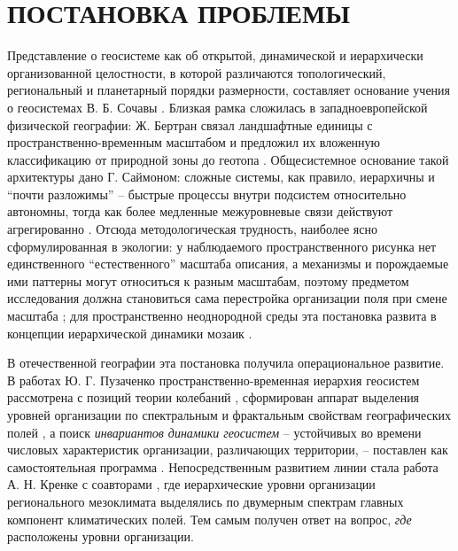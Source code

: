 \documentclass[12pt,a4paper]{article}
\begin{document}
\section{ПОСТАНОВКА ПРОБЛЕМЫ}

Представление о геосистеме как об открытой, динамической и иерархически организованной целостности, в которой различаются топологический, региональный и планетарный порядки размерности, составляет основание учения о геосистемах В. Б. Сочавы \cite{Sochava1978}. Близкая рамка сложилась в западноевропейской физической географии: Ж. Бертран связал ландшафтные единицы с пространственно-временным масштабом и предложил их вложенную классификацию от природной зоны до геотопа \cite{Bertrand1968}. Общесистемное основание такой архитектуры дано Г. Саймоном: сложные системы, как правило, иерархичны и “почти разложимы” -- быстрые процессы внутри подсистем относительно автономны, тогда как более медленные межуровневые связи действуют агрегированно \cite{Simon1962}. Отсюда методологическая трудность, наиболее ясно сформулированная в экологии: у наблюдаемого пространственного рисунка нет единственного “естественного” масштаба описания, а механизмы и порождаемые ими паттерны могут относиться к разным масштабам, поэтому предметом исследования должна становиться сама перестройка организации поля при смене масштаба \cite{Levin1992}; для пространственно неоднородной среды эта постановка развита в концепции иерархической динамики мозаик \cite{WuLoucks1995}.

В отечественной географии эта постановка получила операциональное развитие. В работах Ю. Г. Пузаченко пространственно-временная иерархия геосистем рассмотрена с позиций теории колебаний \cite{Puzachenko1986}, сформирован аппарат выделения уровней организации по спектральным и фрактальным свойствам географических полей \cite{Puzachenko2004}, а поиск \emph{инвариантов динамики геосистем} -- устойчивых во времени числовых характеристик организации, различающих территории, -- поставлен как самостоятельная программа \cite{Puzachenko2010}. Непосредственным развитием линии стала работа А. Н. Кренке с соавторами \cite{Krenke2019}, где иерархические уровни организации регионального мезоклимата выделялись по двумерным спектрам главных компонент климатических полей. Тем самым получен ответ на вопрос, \emph{где} расположены уровни организации.
\end{document}
